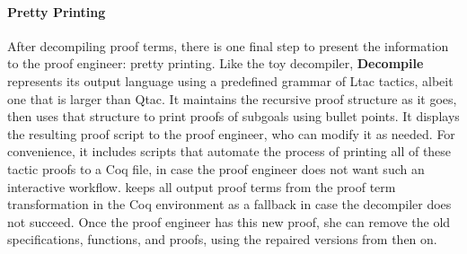 \paragraph{Pretty Printing}
After decompiling proof terms, there is one final step to present the information to the proof engineer: pretty printing.
Like the toy decompiler, \textbf{Decompile} represents its output language using a predefined grammar of Ltac tactics,
albeit one that is larger than Qtac.
It maintains the recursive proof structure as it goes, then uses that structure to print proofs of subgoals using bullet points.
It displays the resulting proof script to the proof engineer, who can modify it as needed.
For convenience, it includes scripts that automate the process of printing all of these tactic proofs to a Coq file,
in case the proof engineer does not want such an interactive workflow.
\toolname keeps all output proof terms from the proof term transformation in the Coq environment as a fallback in case the decompiler does not succeed.
Once the proof engineer has this new proof, she can remove the old specifications, functions, and proofs, using the repaired
versions from then on.


